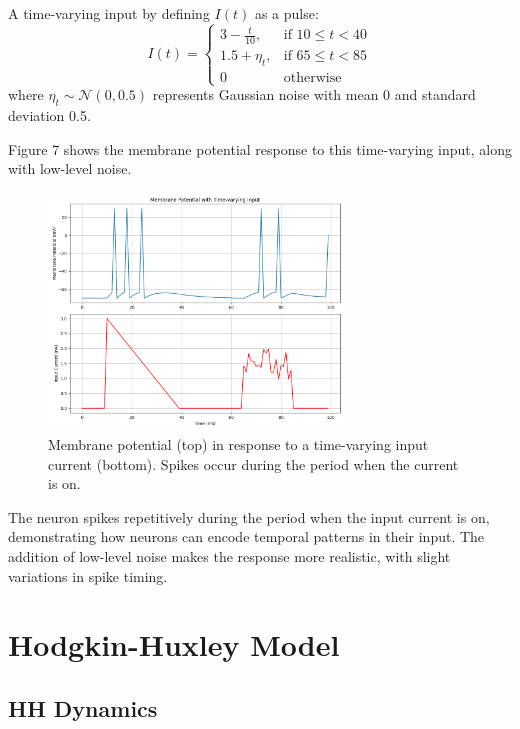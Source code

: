 \documentclass[11pt,a4paper]{article}
\begin{document}
A time-varying input by defining $I(t)$ as a pulse:
\begin{equation}
I(t) = 
\begin{cases}
3 - \frac{t}{10}, & \text{if } 10 \leq t < 40 \\
1.5 + \eta_t, & \text{if } 65 \leq t < 85 \\
0 & \text{otherwise}
\end{cases}
\end{equation}
where $\eta_t \sim \mathcal{N}(0, 0.5)$ represents Gaussian noise with mean 0 and standard deviation 0.5.


Figure 7 shows the membrane potential response to this time-varying input, along with low-level noise.

\begin{figure}[H]
\centering
\includegraphics[width=0.7\textwidth]{fig7.png}
\caption{Membrane potential (top) in response to a time-varying input current (bottom). Spikes occur during the period when the current is on.}
\label{fig:time_varying}
\end{figure}

The neuron spikes repetitively during the period when the input current is on, demonstrating how neurons can encode temporal patterns in their input. The addition of low-level noise makes the response more realistic, with slight variations in spike timing.

\section{Hodgkin-Huxley Model}

\subsection{HH Dynamics}
\end{document}
